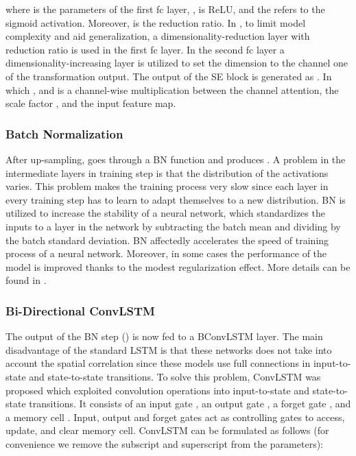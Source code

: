 \documentclass[journal]{IEEEtran}
\begin{document}
\noindent where  is the parameters of the first fc layer, ,  is ReLU, and the  refers to the sigmoid activation. Moreover,  is the reduction ratio. In \cite{hu2018squeeze}, to limit model complexity and aid generalization, a dimensionality-reduction layer with reduction ratio  is used in the first fc layer. In the second fc layer a dimensionality-increasing layer is utilized to set the dimension to the channel one of the transformation output. 
The output of the SE block is generated as . In which , and  is a channel-wise multiplication between the channel attention, the scale factor , and the input feature map.













\subsubsection{Batch Normalization}
After up-sampling,  goes through a BN function and produces . A problem in the intermediate layers in training step is that the distribution of the activations varies. This problem makes the training process very slow since each layer in every training step has to learn to adapt themselves to a new distribution. BN \cite{ioffe2015batch} is utilized to increase the stability of a neural network, which standardizes the inputs to a layer in the network by subtracting the batch mean and dividing by the batch standard deviation. BN affectedly accelerates the speed of training process of a neural network. Moreover, in some cases the performance of the model is improved thanks to the modest regularization effect. More details can be found in \cite{ioffe2015batch}.

\subsubsection{Bi-Directional ConvLSTM}
The output of the BN step () is now fed to a BConvLSTM layer. 
The main disadvantage of the standard LSTM is that these networks does not take into account the spatial correlation since these models use full connections in input-to-state and state-to-state transitions. To solve this problem, ConvLSTM \cite{xingjian2015} was proposed which exploited convolution operations into input-to-state and state-to-state transitions. It consists of an input gate , an output gate , a forget gate , and a memory cell . Input, output and forget gates act as controlling gates to access, update, and clear memory cell. ConvLSTM can be formulated as follows (for convenience we remove the subscript and superscript from the parameters):
\end{document}
